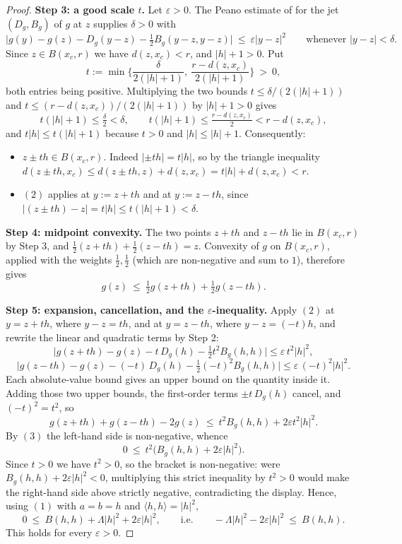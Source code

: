 \begin{proof}
\medskip\noindent\textbf{Step 3: a good scale $t$.} Let $\varepsilon>0$. The Peano estimate
of  for the jet $(D_g,B_g)$ of $g$ at $z$ supplies $\delta>0$ with
\[
 \Big|g(y)-g(z)-D_g(y-z)-\tfrac12B_g(y-z,y-z)\Big|\ \le\ \varepsilon|y-z|^{2}
 \qquad\text{whenever }|y-z|<\delta. \tag{2}
\]
Since $z\in B(x_c,r)$ we have $d(z,x_c)<r$, and $|h|+1>0$. Put
\[
 t:=\min\Big\{\frac{\delta}{2(|h|+1)},\ \frac{r-d(z,x_c)}{2(|h|+1)}\Big\}\ >\ 0 ,
\]
both entries being positive. Multiplying the two bounds $t\le\delta/(2(|h|+1))$ and
$t\le(r-d(z,x_c))/(2(|h|+1))$ by $|h|+1>0$ gives
\[
 t(|h|+1)\le\tfrac\delta2<\delta,\qquad
 t(|h|+1)\le\tfrac{r-d(z,x_c)}2<r-d(z,x_c),
\]
and $t|h|\le t(|h|+1)$ because $t>0$ and $|h|\le|h|+1$. Consequently:
\begin{itemize}
\item $z\pm t h\in B(x_c,r)$. Indeed $|{\pm}t h|=t|h|$, so by the triangle inequality
  $d(z\pm t h,x_c)\le d(z\pm t h,z)+d(z,x_c)=t|h|+d(z,x_c)<r$.
\item $(2)$ applies at $y:=z+t h$ and at $y:=z-t h$, since
  $|(z\pm t h)-z|=t|h|\le t(|h|+1)<\delta$.
\end{itemize}

\medskip\noindent\textbf{Step 4: midpoint convexity.} The two points $z+t h$ and $z-t h$
lie in $B(x_c,r)$ by Step 3, and $\frac12(z+t h)+\frac12(z-t h)=z$. Convexity of $g$ on
$B(x_c,r)$, applied with the weights $\frac12,\frac12$ (which are non-negative and sum to
$1$), therefore gives
\[
 g(z)\ \le\ \tfrac12g(z+t h)+\tfrac12g(z-t h). \tag{3}
\]

\medskip\noindent\textbf{Step 5: expansion, cancellation, and the $\varepsilon$-inequality.}
Apply $(2)$ at $y=z+t h$, where $y-z=t h$, and at $y=z-t h$, where $y-z=(-t)h$, and rewrite
the linear and quadratic terms by Step 2:
\[
 \Big|g(z+t h)-g(z)-t\,D_g(h)-\tfrac12t^{2}B_g(h,h)\Big|\le\varepsilon\,t^{2}|h|^{2},
\]
\[
 \Big|g(z-t h)-g(z)-(-t)\,D_g(h)-\tfrac12(-t)^{2}B_g(h,h)\Big|
  \le\varepsilon\,(-t)^{2}|h|^{2}.
\]
Each absolute-value bound gives an upper bound on the quantity inside it. Adding those two
upper bounds, the first-order terms $\pm t\,D_g(h)$ cancel, and $(-t)^{2}=t^{2}$, so
\[
 g(z+t h)+g(z-t h)-2g(z)\ \le\ t^{2}B_g(h,h)+2\varepsilon t^{2}|h|^{2}.
\]
By $(3)$ the left-hand side is non-negative, whence
\[
 0\ \le\ t^{2}\Big(B_g(h,h)+2\varepsilon|h|^{2}\Big).
\]
Since $t>0$ we have $t^{2}>0$, so the bracket is non-negative: were
$B_g(h,h)+2\varepsilon|h|^{2}<0$, multiplying this strict inequality by $t^{2}>0$ would make
the right-hand side above strictly negative, contradicting the display. Hence, using $(1)$
with $a=b=h$ and $\langle h,h\rangle=|h|^{2}$,
\[
 0\ \le\ B(h,h)+\Lambda|h|^{2}+2\varepsilon|h|^{2},
 \qquad\text{i.e.}\qquad
 -\Lambda|h|^{2}-2\varepsilon|h|^{2}\ \le\ B(h,h). \tag{4}
\]
This holds for every $\varepsilon>0$.


\end{proof}
